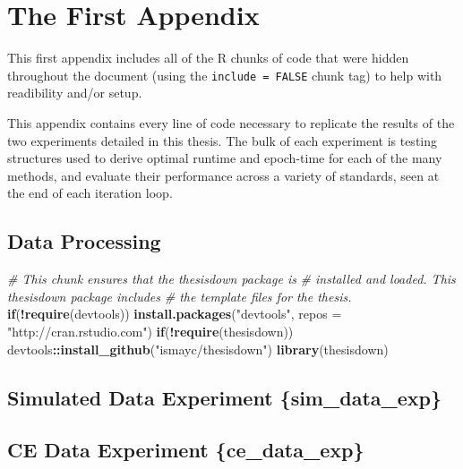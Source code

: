 \documentclass[12pt,twoside]{reedthesis}
\newenvironment{Shaded}{\begin{snugshade}}{\end{snugshade}}
\newcommand{\KeywordTok}[1]{\textcolor[rgb]{0.13,0.29,0.53}{\textbf{#1}}}
\newcommand{\DataTypeTok}[1]{\textcolor[rgb]{0.13,0.29,0.53}{#1}}
\newcommand{\StringTok}[1]{\textcolor[rgb]{0.31,0.60,0.02}{#1}}
\newcommand{\CommentTok}[1]{\textcolor[rgb]{0.56,0.35,0.01}{\textit{#1}}}
\newcommand{\ControlFlowTok}[1]{\textcolor[rgb]{0.13,0.29,0.53}{\textbf{#1}}}
\newcommand{\OperatorTok}[1]{\textcolor[rgb]{0.81,0.36,0.00}{\textbf{#1}}}
\newcommand{\NormalTok}[1]{#1}
\begin{document}
\appendix

\chapter{The First Appendix}\label{the-first-appendix}

This first appendix includes all of the R chunks of code that were
hidden throughout the document (using the \texttt{include\ =\ FALSE}
chunk tag) to help with readibility and/or setup.

This appendix contains every line of code necessary to replicate the
results of the two experiments detailed in this thesis. The bulk of each
experiment is testing structures used to derive optimal runtime and
epoch-time for each of the many methods, and evaluate their performance
across a variety of standards, seen at the end of each iteration loop.

\section{Data Processing}\label{sec:data_process}
\begin{Shaded}
\begin{Highlighting}[]
\CommentTok{# This chunk ensures that the thesisdown package is}
\CommentTok{# installed and loaded. This thesisdown package includes}
\CommentTok{# the template files for the thesis.}
\ControlFlowTok{if}\NormalTok{(}\OperatorTok{!}\KeywordTok{require}\NormalTok{(devtools))}
  \KeywordTok{install.packages}\NormalTok{(}\StringTok{"devtools"}\NormalTok{, }\DataTypeTok{repos =} \StringTok{"http://cran.rstudio.com"}\NormalTok{)}
\ControlFlowTok{if}\NormalTok{(}\OperatorTok{!}\KeywordTok{require}\NormalTok{(thesisdown))}
\NormalTok{  devtools}\OperatorTok{::}\KeywordTok{install_github}\NormalTok{(}\StringTok{"ismayc/thesisdown"}\NormalTok{)}
\KeywordTok{library}\NormalTok{(thesisdown)}
\end{Highlighting}
\end{Shaded}
\section{Simulated Data Experiment
\{sim\_data\_exp\}}\label{simulated-data-experiment-sim_data_exp}

\section{CE Data Experiment
\{ce\_data\_exp\}}\label{ce-data-experiment-ce_data_exp}
\end{document}
